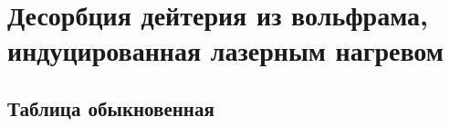 \chapter{Десорбция дейтерия из вольфрама, индуцированная лазерным нагревом}\label{ch:ch4}

\section{Таблица обыкновенная}\label{sec:ch4/sect1}

\clearpage
